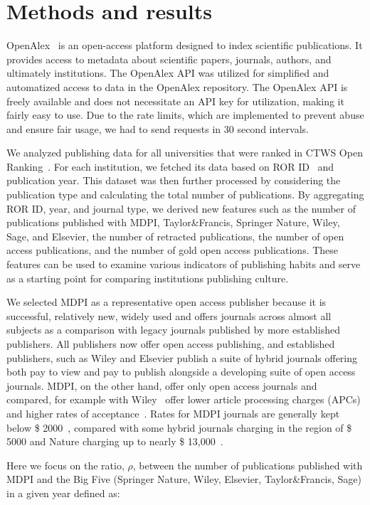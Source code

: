 \documentclass[amsfonts, amssymb, prl, superscriptaddress, notitlepage, twocolumn, nofootinbib]{revtex4-2}
\begin{document}
\section{Methods and results}
OpenAlex~\cite{priem2022openalex} is an open-access platform designed to index scientific publications. It provides access to metadata about scientific papers, journals, authors, and ultimately institutions. The OpenAlex API was utilized for simplified and automatized access to data in the OpenAlex repository. The OpenAlex API is freely available and does not necessitate an API key for utilization, making it fairly easy to use. Due to the rate limits, which are implemented to prevent abuse and ensure fair usage, we had to send requests in 30 second intervals. 

We analyzed publishing data for all universities that were ranked in CTWS Open Ranking~\cite{cwts2024leiden}. For each institution, we fetched its data based on ROR ID~\cite{ROR} and publication year. This dataset was then further processed by considering the publication type and calculating the total number of publications. By aggregating ROR ID, year, and journal type, we derived new features such as the number of publications published with MDPI, Taylor\&Francis, Springer Nature, Wiley, Sage, and Elsevier, the number of retracted publications, the number of open access publications, and the number of gold open access publications. These features can be used to examine various indicators of publishing habits and serve as a starting point for comparing institutions publishing culture. 

We selected MDPI as a representative open access publisher because it is successful, relatively new, widely used and offers journals across almost all subjects as a comparison with legacy journals published by more established publishers. All publishers now offer open access publishing, and established publishers, such as Wiley and Elsevier publish a suite of hybrid journals offering both pay to view and pay to publish alongside a developing suite of open access journals. MDPI, on the other hand, offer only open access journals and compared, for example with Wiley~\cite{wiley} offer lower article processing charges (APCs) and higher rates of acceptance~\cite{fillon2024should}. Rates for MDPI journals are generally kept below \$ 2000~\cite{mdpi_apc}, compared with some hybrid journals charging in the region of \$ 5000 and Nature charging up to nearly \$ 13,000~\cite{nature_publishing_options}.

Here we focus on the ratio, $\rho$, between the number of publications published with MDPI and the Big Five (Springer Nature, Wiley, Elsevier, Taylor\&Francis, Sage) in a given year defined as: 
\end{document}
